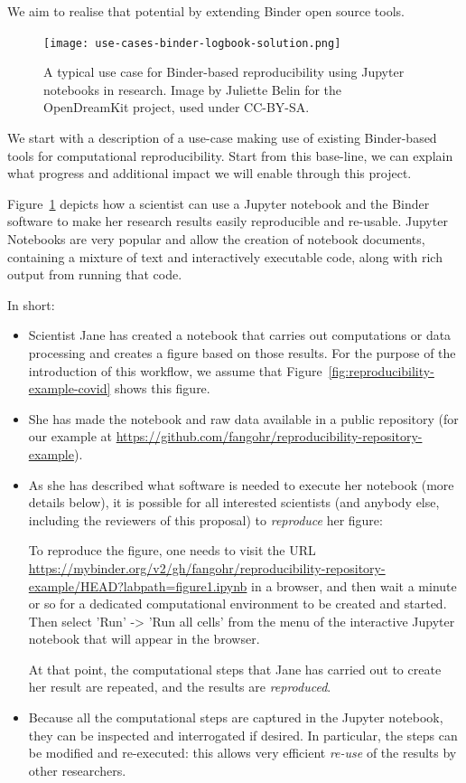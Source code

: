 We aim to realise that potential by extending Binder open source tools.

\begin{figure}[htb]\centering
  \texttt{[image: use-cases-binder-logbook-solution.png]}
  \caption{A typical use case for Binder-based reproducibility using Jupyter notebooks in research.
            Image by Juliette Belin for the OpenDreamKit project, used under
            CC-BY-SA.}\label{fig:use-cases-binder}
\end{figure}

We start with a description of a use-case making use of existing Binder-based
tools for computational reproducibility. Start from this base-line, we can
explain what progress and additional impact we will enable through this project.

Figure~\ref{fig:use-cases-binder} depicts how a scientist can use a Jupyter
notebook and the Binder software to make her research results easily
reproducible and re-usable. Jupyter Notebooks are very popular and allow the creation of notebook
documents, containing a mixture of text and interactively executable code, along with rich output from
running that code.

 In short:
\begin{itemize}
\item Scientist Jane has created a notebook that carries out computations or
  data processing and creates a figure based on those results. For the purpose
  of the introduction of this workflow, we assume that
  Figure~\ref{fig:reproducibility-example-covid} shows this figure.

\item She has made the notebook and raw data available in a public repository
  (for our example at\newline
  \mbox{\url{https://github.com/fangohr/reproducibility-repository-example}}).

\item As she has described what software is needed to execute her notebook (more
  details below), it is possible for all interested scientists (and anybody
  else, including the reviewers of this proposal) to \emph{reproduce} her
  figure:

  To reproduce the figure, one needs to visit the URL\newline
  \mbox{\url{https://mybinder.org/v2/gh/fangohr/reproducibility-repository-example/HEAD?labpath=figure1.ipynb}}
  in a browser, and then wait a minute or so for a dedicated computational
  environment to be created and started. Then select 'Run' -> 'Run all cells'
  from the menu of the interactive Jupyter notebook that will appear in the
  browser.

  At that point, the computational steps that Jane has carried out to create her
  result are repeated, and the results are \emph{reproduced}.

\item Because all the computational steps are captured in the Jupyter notebook,
  they can be inspected and interrogated if desired. In particular, the steps
  can be modified and re-executed: this allows very efficient \emph{re-use} of
  the results by other researchers.
\end{itemize}

